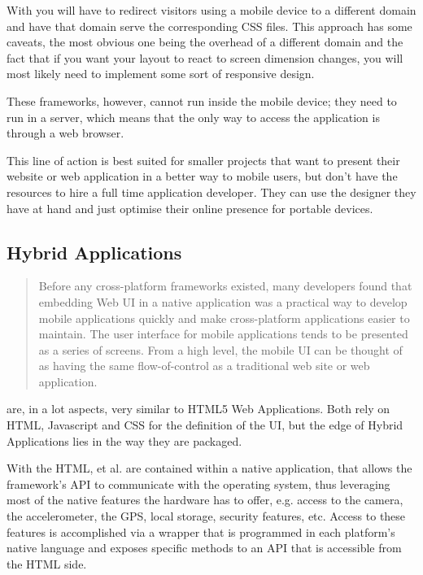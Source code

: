 With  you will have to redirect visitors using a mobile device to a different domain and have that domain serve the corresponding CSS files. This approach has some caveats, the most obvious one being the overhead of a different domain and the fact that if you want your layout to react to screen dimension changes, you will most likely need to implement some sort of responsive design.   
 

These frameworks, however, cannot run inside the mobile device; they need to run in a server, which means that the only way to access the application is through a web browser.


This line of action is best suited for smaller projects that want to present their website or web application in a better way to mobile users, but don't have the resources to hire a full time application developer. They can use the designer they have at hand and just optimise their online presence for portable devices.

\subsection{Hybrid Applications}\label{sec:hyb_app}
\begin{quotation}
Before any cross-platform frameworks existed, many developers found that embedding Web UI in a native application was a practical way to develop mobile applications quickly and make cross-platform applications easier to maintain. The user interface for mobile applications tends to be presented as a series of screens. From a high level, the mobile UI can be thought of as having the same flow-of-control as a traditional web site or web application. \cite[p. 28]{allen:2010}
\end{quotation}

 are, in a lot aspects, very similar to HTML5 Web Applications. Both rely on HTML, Javascript and CSS for the definition of the UI, but the edge of Hybrid Applications lies in the way they are packaged.


With  the HTML, et al. are contained within a native application, that allows the framework's API to communicate with the operating system, thus leveraging most of the native features the hardware has to offer, e.g. access to the camera, the accelerometer, the GPS, local storage, security features, etc. Access to these features is accomplished via a wrapper that is programmed in each platform's native language and exposes specific methods to an API that is accessible from the HTML side.


